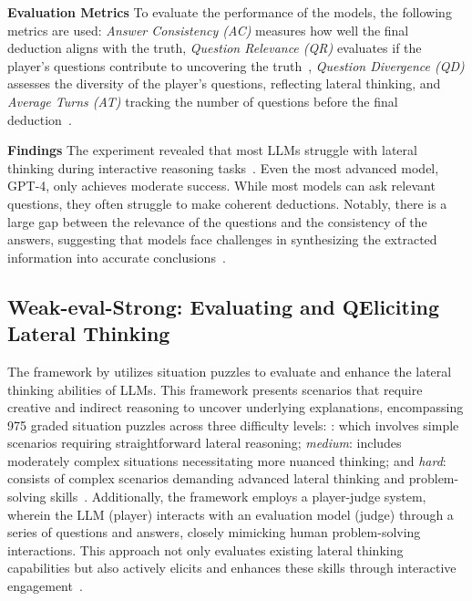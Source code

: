 \textbf{Evaluation Metrics}
To evaluate the performance of the models, the following metrics are used: \textit{Answer Consistency (AC)} measures how well the final deduction aligns with the truth, \textit{Question Relevance (QR)} evaluates if the player's questions contribute to uncovering the truth~\cite{huangLatEvalInteractiveLLMs2024}, \textit{Question Divergence (QD)} assesses the diversity of the player's questions, reflecting lateral thinking, and \textit{Average Turns (AT)} tracking the number of questions before the final deduction~\cite{huangLatEvalInteractiveLLMs2024}.

\textbf{Findings}
The experiment revealed that most \acp{LLM} struggle with lateral thinking during interactive reasoning tasks~\cite{huangLatEvalInteractiveLLMs2024}. Even the most advanced model, GPT-4, only achieves moderate success. While most models can ask relevant questions, they often struggle to make coherent deductions. Notably, there is a large gap between the relevance of the questions and the consistency of the answers, suggesting that models face challenges in synthesizing the extracted information into accurate conclusions~\cite{huangLatEvalInteractiveLLMs2024}.

\subsection{Weak-eval-Strong: Evaluating and QEliciting Lateral Thinking}

The  framework by \textcite{chenWeakevalStrongEvaluatingEliciting2024} utilizes situation puzzles to evaluate and enhance the lateral thinking abilities of \acp{LLM}. This framework presents scenarios that require creative and indirect reasoning to uncover underlying explanations, encompassing 975 graded situation puzzles across three difficulty levels: : which involves simple scenarios requiring straightforward lateral reasoning; \textit{medium}: includes moderately complex situations necessitating more nuanced thinking; and \textit{hard}: consists of complex scenarios demanding advanced lateral thinking and problem-solving skills~\cite{chenWeakevalStrongEvaluatingEliciting2024}. Additionally, the framework employs a player-judge system, wherein the LLM (player) interacts with an evaluation model (judge) through a series of questions and answers, closely mimicking human problem-solving interactions. This approach not only evaluates existing lateral thinking capabilities but also actively elicits and enhances these skills through interactive engagement~\cite{chenWeakevalStrongEvaluatingEliciting2024}.

